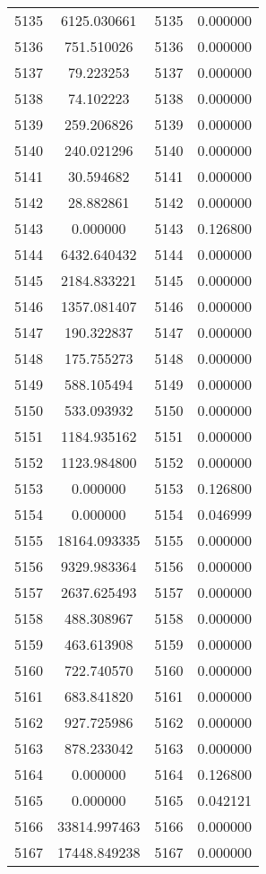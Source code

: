 \documentclass[12pt]{article}
\begin{document}
\begin{longtable}{@{}cccc@{}}
5135 & 6125.030661 & 5135 & 0.000000 \\
5136 & 751.510026 & 5136 & 0.000000 \\
5137 & 79.223253 & 5137 & 0.000000 \\
5138 & 74.102223 & 5138 & 0.000000 \\
5139 & 259.206826 & 5139 & 0.000000 \\
5140 & 240.021296 & 5140 & 0.000000 \\
5141 & 30.594682 & 5141 & 0.000000 \\
5142 & 28.882861 & 5142 & 0.000000 \\
5143 & 0.000000 & 5143 & 0.126800 \\
5144 & 6432.640432 & 5144 & 0.000000 \\
5145 & 2184.833221 & 5145 & 0.000000 \\
5146 & 1357.081407 & 5146 & 0.000000 \\
5147 & 190.322837 & 5147 & 0.000000 \\
5148 & 175.755273 & 5148 & 0.000000 \\
5149 & 588.105494 & 5149 & 0.000000 \\
5150 & 533.093932 & 5150 & 0.000000 \\
5151 & 1184.935162 & 5151 & 0.000000 \\
5152 & 1123.984800 & 5152 & 0.000000 \\
5153 & 0.000000 & 5153 & 0.126800 \\
5154 & 0.000000 & 5154 & 0.046999 \\
5155 & 18164.093335 & 5155 & 0.000000 \\
5156 & 9329.983364 & 5156 & 0.000000 \\
5157 & 2637.625493 & 5157 & 0.000000 \\
5158 & 488.308967 & 5158 & 0.000000 \\
5159 & 463.613908 & 5159 & 0.000000 \\
5160 & 722.740570 & 5160 & 0.000000 \\
5161 & 683.841820 & 5161 & 0.000000 \\
5162 & 927.725986 & 5162 & 0.000000 \\
5163 & 878.233042 & 5163 & 0.000000 \\
5164 & 0.000000 & 5164 & 0.126800 \\
5165 & 0.000000 & 5165 & 0.042121 \\
5166 & 33814.997463 & 5166 & 0.000000 \\
5167 & 17448.849238 & 5167 & 0.000000 \\

\end{longtable}
\end{document}
